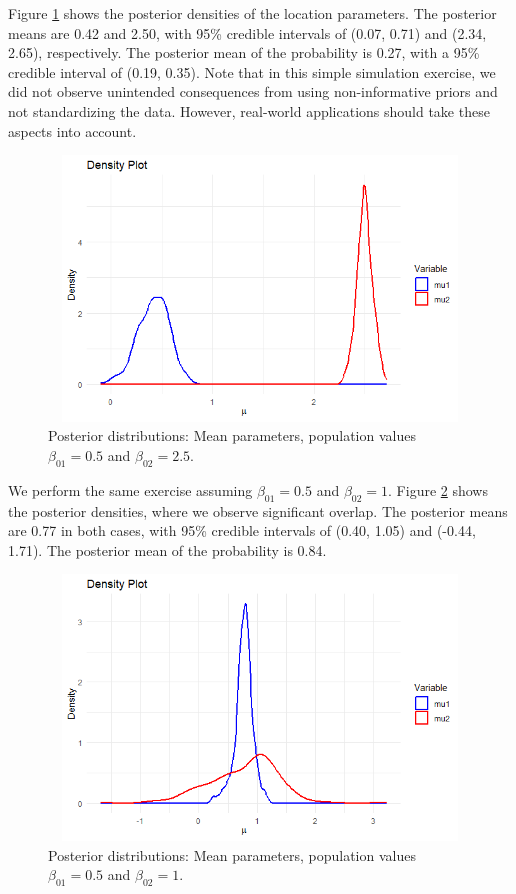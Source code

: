 Figure \ref{figMean1} shows the posterior densities of the location parameters. The posterior means are 0.42 and 2.50, with 95\% credible intervals of (0.07, 0.71) and (2.34, 2.65), respectively. The posterior mean of the probability is 0.27, with a 95\% credible interval of (0.19, 0.35). Note that in this simple simulation exercise, we did not observe unintended consequences from using non-informative priors and not standardizing the data. However, real-world applications should take these aspects into account. 

\begin{figure}[!h]
	\includegraphics[width=340pt, height=200pt]{Chapters/chapter11/figures/Sim1LSI.png}
	\caption[List of figure caption goes here]{Posterior distributions: Mean parameters, population values $\beta_{01}=0.5$ and $\beta_{02}=2.5$.}\label{figMean1}
\end{figure}

We perform the same exercise assuming $\beta_{01}=0.5$ and $\beta_{02}=1$. Figure \ref{figMean2} shows the posterior densities, where we observe significant overlap. The posterior means are 0.77 in both cases, with 95\% credible intervals of (0.40, 1.05) and (-0.44, 1.71). The posterior mean of the probability is 0.84. 
 
\begin{figure}[!h]
	\includegraphics[width=340pt, height=200pt]{Chapters/chapter11/figures/Sim2LSI.png}
	\caption[List of figure caption goes here]{Posterior distributions: Mean parameters, population values $\beta_{01}=0.5$ and $\beta_{02}=1$.}\label{figMean2}
\end{figure}


